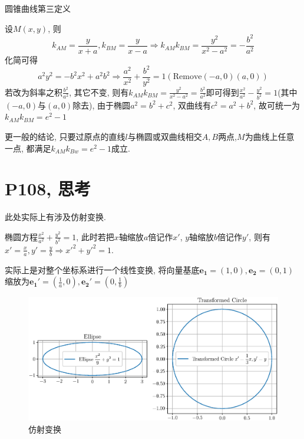 \documentclass{book}
\begin{document}
        \textcolor[rgb]{0.38,0.11,0.2}{圆锥曲线第三定义}

        设$M(x,y)$, 则$$k_{AM}=\frac{y}{x+a},k_{BM}=\frac{y}{x-a}\Longrightarrow k_{AM}k_{BM}=\frac{y^2}{x^2-a^2}=-\frac{b^2}{a^2}$$
        化简可得$$a^2y^2=-b^2x^2+a^2b^2\Longrightarrow \frac{a^2}{x^2}+\frac{b^2}{y^2}=1(\mathrm{Remove} (-a,0)(a,0))$$
        若改为斜率之积$\frac{b^2}{a^2}$, 其它不变, 则有$\displaystyle k_{AM}k_{BM}=\frac{y^2}{x^2-a^2}=\frac{b^2}{a^2}$即可得到$\displaystyle \frac{x^2}{a^2}-\frac{y^2}{b^2}=1$(其中$(-a,0)$与$(a,0)$除去), 由于椭圆$a^2=b^2+c^2$, 双曲线有$c^2=a^2+b^2$, 故可\textcolor[rgb]{0.75,0.17,0.22}{统一为$k_{AM}k_{BM}=e^2-1$}

        更一般的结论, 只要过原点的直线$l$与椭圆或双曲线相交$A,B$两点,$M$为曲线上任意一点, 都满足$k_{AM}k_{Bw}=e^2-1$成立.
        \section{\textcolor[rgb]{0.11,0.65,0.52}{P108, 思考}}
        此处实际上有涉及\textcolor[rgb]{0.38,0.11,0.2}{仿射变换}.
        
        椭圆方程$\displaystyle \frac{x^2}{a^2}+\frac{y^2}{b^2}=1$, 此时若\textcolor[rgb]{0.75,0.17,0.22}{把$x$轴缩放$a$倍记作$x'$, $y$轴缩放$b$倍记作$y'$}, 则有$\displaystyle x'=\frac{x}{a},y'=\frac{y}{b}\Longrightarrow x'^2+y'^2=1$.

        实际上是对整个坐标系进行一个线性变换, 将向量基底$\boldsymbol{e_1}=(1,0),\boldsymbol{e_2}=(0,1)$缩放为$\displaystyle \boldsymbol{e_1'}=(\frac{1}{a},0),\boldsymbol{e_2'}=(0,\frac{1}{b})$
        
        \begin{figure}[htbp]
            \centering
            \includegraphics[width=\textwidth]{img/AffineTransform.eps}
            \caption{仿射变换}
        \end{figure}
\end{document}
